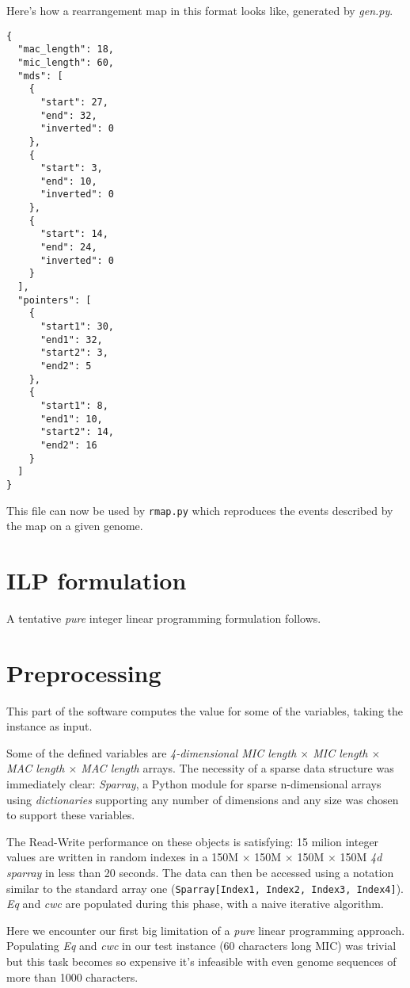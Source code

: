 Here's how a rearrangement map in this format looks like, generated by \textit{gen.py}.

\begin{verbatim}
{
  "mac_length": 18,
  "mic_length": 60,
  "mds": [
    {
      "start": 27,
      "end": 32,
      "inverted": 0
    },
    {
      "start": 3,
      "end": 10,
      "inverted": 0
    },
    {
      "start": 14,
      "end": 24,
      "inverted": 0
    }
  ],
  "pointers": [
    {
      "start1": 30,
      "end1": 32,
      "start2": 3,
      "end2": 5
    },
    {
      "start1": 8,
      "end1": 10,
      "start2": 14,
      "end2": 16
    }
  ]
}
\end{verbatim}

This file can now be used by \texttt{rmap.py} which reproduces the events described by the map on a given genome.
\clearpage
\section{ILP formulation}
A tentative \textit{pure} integer linear programming formulation follows.



\section{Preprocessing}
This part of the software computes the value for some of the variables, taking the instance as input.

Some of the defined variables are \textit{4-dimensional MIC length $\times$ MIC length $\times$ MAC length $\times$ MAC length} arrays. The necessity of a sparse data structure was immediately clear: \textit{Sparray}, a Python module \cite{sparray} for sparse n-dimensional arrays using \textit{dictionaries} supporting any number of dimensions and any size was chosen to support these variables.

The Read-Write performance on these objects is satisfying: 15 milion integer values are written in random indexes in a 150M $\times$ 150M $\times$ 150M $\times$ 150M \textit{4d sparray} in less than 20 seconds. The data can then be accessed using a notation similar to the standard array one (\texttt{Sparray[Index1, Index2, Index3, Index4]}). \textit{Eq} and \textit{cwc} are populated during this phase, with a naive iterative algorithm.

Here we encounter our first big limitation of a \textit{pure} linear programming approach. Populating \textit{Eq} and \textit{cwc} in our test instance (60 characters long MIC) was trivial but this task becomes so expensive it's infeasible with even genome sequences of more than 1000 characters.

